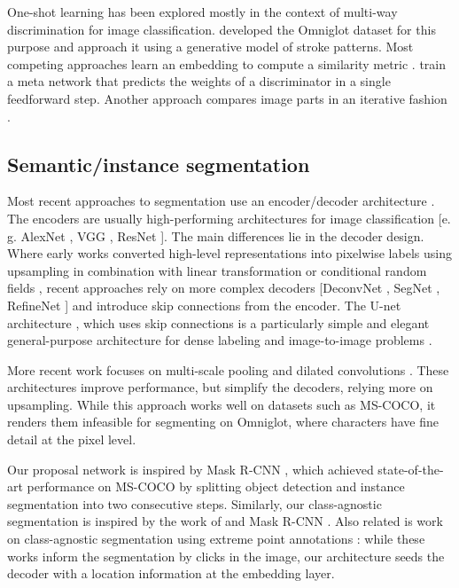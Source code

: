 \documentclass{article}
\begin{document}
One-shot learning has been explored mostly in the context of multi-way discrimination for image classification.
\citeauthor{Lake2015} \citeyearpar{Lake2015} developed the Omniglot dataset for this purpose and approach it using a generative model of stroke patterns. 
Most competing approaches learn an embedding to compute a similarity metric \cite{Koch2015a, Vinyals2016,Snell2017,Triantafillou2017a}.
\citeauthor{Bertinetto2016} \citeyearpar{Bertinetto2016} train a meta network that predicts the weights of a discriminator in a single feedforward step.
Another approach compares image parts in an iterative fashion \cite{Shyam2017}.




\subsection{Semantic/instance segmentation}

Most recent approaches to segmentation use an encoder/decoder architecture \cite{Noh2015a,Badrinarayanan2017}.
The encoders are usually high-performing architectures for image classification [e.\,g. AlexNet \cite{Krizhevsky2012}, VGG \cite{Simonyan2015}, ResNet \cite{He2016a}].
The main differences lie in the decoder design.
Where early works converted high-level representations into pixelwise labels using upsampling in combination with linear transformation \cite{Long2015} or conditional random fields \cite{Chen2014, Chen2018}, recent approaches rely on more complex decoders [DeconvNet \cite{Noh2015a}, SegNet \cite{Badrinarayanan2017}, RefineNet \cite{Lin2017}] and introduce skip connections from the encoder.
The U-net architecture \citep{Ronneberger2015a}, which uses skip connections is a particularly simple and elegant general-purpose architecture for dense labeling and image-to-image problems \citep[e.\,g.][]{Isola2016}.

More recent work focuses on multi-scale pooling \cite{Zhao2017a} and dilated convolutions \cite{Chen2017c}.
These architectures improve performance, but simplify the decoders, relying more on upsampling. While this approach works well on datasets such as MS-COCO, it renders them infeasible for segmenting on Omniglot, where characters have fine detail at the pixel level.

Our proposal network is inspired by Mask R-CNN \cite{He2017a}, which achieved state-of-the-art performance on MS-COCO by splitting object detection and instance segmentation into two consecutive steps.
Similarly, our class-agnostic segmentation is inspired by the work of \citeauthor{Hong2015a} \citeyearpar{Hong2015a} and Mask R-CNN \cite{He2017a}.
Also related is work on class-agnostic segmentation using extreme point annotations \cite{Maninis2017,Papadopoulos2017}: while these works inform the segmentation by clicks in the image, our architecture seeds the decoder with a location information at the embedding layer.
\end{document}
